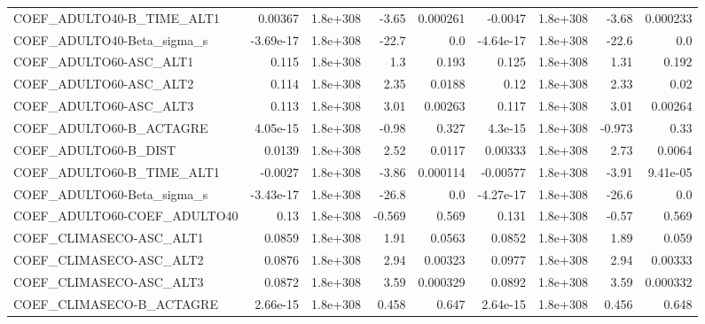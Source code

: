 \begin{tabular}{lrrrrrrrr}
COEF\_ADULTO40-B\_TIME\_ALT1         &     0.00367 &     1.8e+308 &     -3.65 & 0.000261 &    -0.0047 &    1.8e+308 &        -3.68 &      0.000233 \\
COEF\_ADULTO40-Beta\_sigma\_s        &   -3.69e-17 &     1.8e+308 &     -22.7 &      0.0 &  -4.64e-17 &    1.8e+308 &        -22.6 &           0.0 \\
COEF\_ADULTO60-ASC\_ALT1            &       0.115 &     1.8e+308 &       1.3 &    0.193 &      0.125 &    1.8e+308 &         1.31 &         0.192 \\
COEF\_ADULTO60-ASC\_ALT2            &       0.114 &     1.8e+308 &      2.35 &   0.0188 &       0.12 &    1.8e+308 &         2.33 &          0.02 \\
COEF\_ADULTO60-ASC\_ALT3            &       0.113 &     1.8e+308 &      3.01 &  0.00263 &      0.117 &    1.8e+308 &         3.01 &       0.00264 \\
COEF\_ADULTO60-B\_ACTAGRE           &    4.05e-15 &     1.8e+308 &     -0.98 &    0.327 &    4.3e-15 &    1.8e+308 &       -0.973 &          0.33 \\
COEF\_ADULTO60-B\_DIST              &      0.0139 &     1.8e+308 &      2.52 &   0.0117 &    0.00333 &    1.8e+308 &         2.73 &        0.0064 \\
COEF\_ADULTO60-B\_TIME\_ALT1         &     -0.0027 &     1.8e+308 &     -3.86 & 0.000114 &   -0.00577 &    1.8e+308 &        -3.91 &      9.41e-05 \\
COEF\_ADULTO60-Beta\_sigma\_s        &   -3.43e-17 &     1.8e+308 &     -26.8 &      0.0 &  -4.27e-17 &    1.8e+308 &        -26.6 &           0.0 \\
COEF\_ADULTO60-COEF\_ADULTO40       &        0.13 &     1.8e+308 &    -0.569 &    0.569 &      0.131 &    1.8e+308 &        -0.57 &         0.569 \\
COEF\_CLIMASECO-ASC\_ALT1           &      0.0859 &     1.8e+308 &      1.91 &   0.0563 &     0.0852 &    1.8e+308 &         1.89 &         0.059 \\
COEF\_CLIMASECO-ASC\_ALT2           &      0.0876 &     1.8e+308 &      2.94 &  0.00323 &     0.0977 &    1.8e+308 &         2.94 &       0.00333 \\
COEF\_CLIMASECO-ASC\_ALT3           &      0.0872 &     1.8e+308 &      3.59 & 0.000329 &     0.0892 &    1.8e+308 &         3.59 &      0.000332 \\
COEF\_CLIMASECO-B\_ACTAGRE          &    2.66e-15 &     1.8e+308 &     0.458 &    0.647 &   2.64e-15 &    1.8e+308 &        0.456 &         0.648 \\

\end{tabular}
